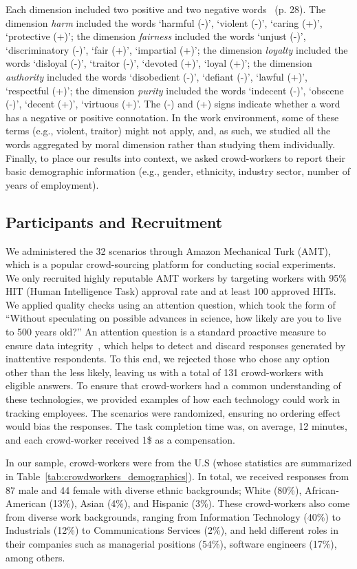 Each dimension included two positive and two negative words~\cite{hidalgo2021humans} (p. 28). The dimension \emph{harm} included the words `harmful (-)', `violent (-)', `caring (+)', `protective (+)'; the dimension \emph{fairness} included the words `unjust (-)', `discriminatory (-)', `fair (+)', `impartial (+)'; the dimension  \emph{loyalty} included the words `disloyal (-)', `traitor (-)', `devoted (+)', `loyal (+)'; the dimension \emph{authority} included the words `disobedient (-)', `defiant (-)', `lawful (+)', `respectful (+)'; the dimension \emph{purity} included the words `indecent (-)', `obscene (-)', `decent (+)', `virtuous (+)'. The (-) and (+) signs indicate whether a word has a negative or positive connotation. In the work environment, some of these terms (e.g., violent, traitor) might not apply, and, as such, we studied all the words aggregated by moral dimension rather than studying them individually. Finally, to place our results into context, we asked crowd-workers to report their basic demographic information  (e.g., gender, ethnicity, industry sector, number of years of employment).

\subsection{Participants and Recruitment}
We administered the 32 scenarios through Amazon Mechanical Turk (AMT), which is a popular crowd-sourcing platform for conducting social experiments. We only recruited highly reputable AMT workers by targeting workers with 95\% HIT (Human Intelligence Task) approval rate and at least 100 approved HITs. We applied quality checks using an attention question, which took the form of ``Without speculating on possible advances in science, how likely are you to live to 500 years old?'' An attention question is a standard proactive measure to ensure data integrity~\cite{peer2014reputation}, which helps to detect and discard responses generated by inattentive respondents. To this end, we rejected those who chose any option other than the less likely, leaving us with a total of 131 crowd-workers with eligible answers. To ensure that crowd-workers had a common understanding of these technologies, we provided examples of how each technology could work in tracking employees. The scenarios were randomized, ensuring no ordering effect would bias the responses. The task completion time was, on average, 12 minutes, and each crowd-worker received 1\$ as a compensation.

In our sample, crowd-workers were from the U.S (whose statistics are summarized in Table~\ref{tab:crowdworkers_demographics}). In total, we received responses from 87 male and 44 female with diverse ethnic backgrounds; White (80\%), African-American (13\%), Asian (4\%), and Hispanic (3\%). These crowd-workers also come from diverse work backgrounds, ranging from Information Technology (40\%) to Industrials (12\%) to Communications Services (2\%), and held different roles in their companies such as managerial positions (54\%), software engineers (17\%), among others.

